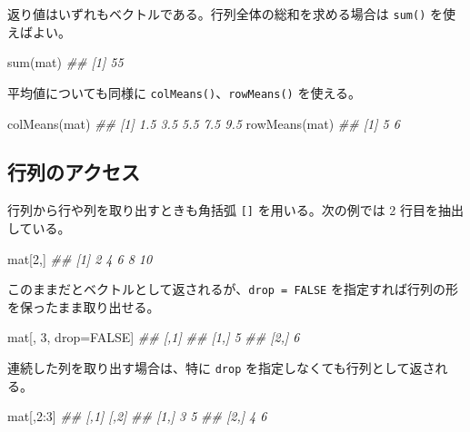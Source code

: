 \documentclass[
  letterpaper,
  xelatex,
  ja=standard, xelatex]{bxjsbook}
\newenvironment{Shaded}{\begin{snugshade}}{\end{snugshade}}
\newcommand{\ConstantTok}[1]{\textcolor[rgb]{0.56,0.35,0.01}{#1}}
\newcommand{\DecValTok}[1]{\textcolor[rgb]{0.68,0.00,0.00}{#1}}
\newcommand{\DocumentationTok}[1]{\textcolor[rgb]{0.37,0.37,0.37}{\textit{#1}}}
\newcommand{\FunctionTok}[1]{\textcolor[rgb]{0.28,0.35,0.67}{#1}}
\newcommand{\NormalTok}[1]{\textcolor[rgb]{0.00,0.23,0.31}{#1}}
\newcommand{\OtherTok}[1]{\textcolor[rgb]{0.00,0.23,0.31}{#1}}
\newcommand{\SpecialCharTok}[1]{\textcolor[rgb]{0.37,0.37,0.37}{#1}}
\begin{document}
返り値はいずれもベクトルである。行列全体の総和を求める場合は
\texttt{sum()} を使えばよい。

\begin{Shaded}
\begin{Highlighting}[]
\FunctionTok{sum}\NormalTok{(mat)}
\DocumentationTok{\#\# [1] 55}
\end{Highlighting}
\end{Shaded}

平均値についても同様に \texttt{colMeans()}、\texttt{rowMeans()}
を使える。

\begin{Shaded}
\begin{Highlighting}[]
\FunctionTok{colMeans}\NormalTok{(mat)}
\DocumentationTok{\#\# [1] 1.5 3.5 5.5 7.5 9.5}
\FunctionTok{rowMeans}\NormalTok{(mat)}
\DocumentationTok{\#\# [1] 5 6}
\end{Highlighting}
\end{Shaded}

\subsection{行列のアクセス}\label{ux884cux5217ux306eux30a2ux30afux30bbux30b9}

行列から行や列を取り出すときも角括弧 \texttt{{[}{]}}
を用いる。次の例では 2 行目を抽出している。

\begin{Shaded}
\begin{Highlighting}[]
\NormalTok{mat[}\DecValTok{2}\NormalTok{,]}
\DocumentationTok{\#\# [1]  2  4  6  8 10}
\end{Highlighting}
\end{Shaded}

このままだとベクトルとして返されるが、\texttt{drop\ =\ FALSE}
を指定すれば行列の形を保ったまま取り出せる。

\begin{Shaded}
\begin{Highlighting}[]
\NormalTok{mat[, }\DecValTok{3}\NormalTok{, drop}\OtherTok{=}\ConstantTok{FALSE}\NormalTok{]}
\DocumentationTok{\#\#      [,1]}
\DocumentationTok{\#\# [1,]    5}
\DocumentationTok{\#\# [2,]    6}
\end{Highlighting}
\end{Shaded}

連続した列を取り出す場合は、特に \texttt{drop}
を指定しなくても行列として返される。

\begin{Shaded}
\begin{Highlighting}[]
\NormalTok{mat[,}\DecValTok{2}\SpecialCharTok{:}\DecValTok{3}\NormalTok{]}
\DocumentationTok{\#\#      [,1] [,2]}
\DocumentationTok{\#\# [1,]    3    5}
\DocumentationTok{\#\# [2,]    4    6}
\end{Highlighting}
\end{Shaded}
\end{document}
